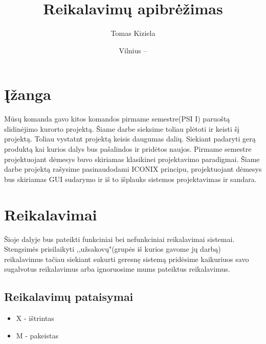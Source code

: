 \documentclass[oneside]{VUMIFPSkursinis}
\title{Reikalavimų apibrėžimas}
\author{Tomas Kiziela}
\date{Vilnius – \the\year}
\begin{document}
\maketitle
\tableofcontents

\section{Įžanga}
Mūsų komanda gavo kitos komandos pirmame semestre(PSI I) paruoštą slidinėjimo kurorto projektą. Šiame darbe sieksime toliau plėtoti ir keisti šį projektą. Toliau vystatnt projektą keisis daugumas dalių. Siekiant padaryti gerą produktą kai kurios  dalys bus pašalindos ir pridėtos naujos. Pirmame semestre projektuojant dėmesys buvo skiriamas klasikinei projektavimo paradigmai. Šiame darbe projektą rašysime pasinaudodami ICONIX principu, projektuojant dėmesys bus skiriamas GUI sudarymo ir iš to išplauks sistemos projektavimas ir sandara. 

\section{Reikalavimai}
Šioje dalyje bus pateikti funkciniai bei nefunkciniai reikalavimai sistemai. Stengsimės prisilaikyti ,,užsakovų"(grupės iš kurios gavome jų darbą) reikalavimus tačiau siekiant sukurti geresnę sistemą pridėsime kaikuriuos savo sugalvotus reikalavimus arba ignoruosime mums pateiktus reikalavimus. 

\subsection{Reikalavimų pataisymai}
	\begin{itemize}
		\item{X - ištrintas}
		\item{M - pakeistas}
	\end{itemize}

\end{document}
